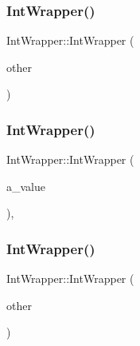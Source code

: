 \mbox{\label{class_int_wrapper_af23efe3c8d8bf176948922b41e8f253e}} 
\subsubsection{\texorpdfstring{IntWrapper()}{IntWrapper()}\hspace{0.1cm}{\footnotesize\ttfamily [2/6]}}
{\footnotesize\ttfamily Int\+Wrapper\+::\+Int\+Wrapper (\begin{DoxyParamCaption}\item[{const \mbox{\hyperlink{class_int_wrapper}{Int\+Wrapper}} \&}]{other }\end{DoxyParamCaption})\hspace{0.3cm}{\ttfamily [inline]}}

\mbox{\label{class_int_wrapper_a1d35e0d0b9c0fc109a8d2a2118ae6010}} 
\subsubsection{\texorpdfstring{IntWrapper()}{IntWrapper()}\hspace{0.1cm}{\footnotesize\ttfamily [3/6]}}
{\footnotesize\ttfamily Int\+Wrapper\+::\+Int\+Wrapper (\begin{DoxyParamCaption}\item[{int}]{a\+\_\+value }\end{DoxyParamCaption})\hspace{0.3cm}{\ttfamily [inline]}, {\ttfamily [explicit]}}

\mbox{\label{class_int_wrapper_af23efe3c8d8bf176948922b41e8f253e}} 
\subsubsection{\texorpdfstring{IntWrapper()}{IntWrapper()}\hspace{0.1cm}{\footnotesize\ttfamily [4/6]}}
{\footnotesize\ttfamily Int\+Wrapper\+::\+Int\+Wrapper (\begin{DoxyParamCaption}\item[{const \mbox{\hyperlink{class_int_wrapper}{Int\+Wrapper}} \&}]{other }\end{DoxyParamCaption})\hspace{0.3cm}{\ttfamily [inline]}}

